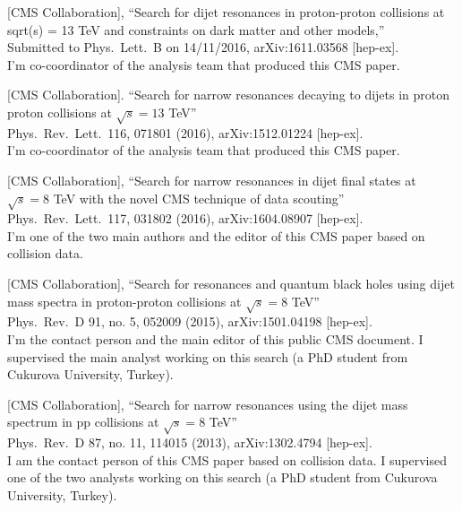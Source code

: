 \documentclass[10pt, a4paper]{article}
\begin{document}


\begin{thebibliography}{599}

  [CMS Collaboration],
  ``Search for dijet resonances in proton-proton collisions at sqrt(s) = 13 TeV and constraints on dark matter and other models,''\\
  Submitted to Phys.\ Lett.\ B on 14/11/2016, arXiv:1611.03568 [hep-ex].\\
  I'm co-coordinator of the analysis team that produced this CMS paper.
 
  [CMS Collaboration].
  ``Search for narrow resonances decaying to  dijets in proton
    proton collisions at $\sqrt{s}=13$ TeV''\\
  Phys.\ Rev.\ Lett.\  116, 071801 (2016), arXiv:1512.01224 [hep-ex].\\
I'm co-coordinator of the analysis team that produced this CMS paper.

[CMS Collaboration],
  ``Search for narrow resonances in dijet final states at $\sqrt{s}=8$
  TeV with the novel CMS technique of data scouting''\\
  Phys.\ Rev.\ Lett.\  117, 031802 (2016), arXiv:1604.08907 [hep-ex].
\\I'm one of the two main authors and the editor of this CMS paper based on
collision data.

  [CMS Collaboration],
  ``Search for resonances and quantum black holes using dijet mass
  spectra in proton-proton collisions at $\sqrt{s}=8$ TeV''\\
  Phys.\ Rev.\ D 91, no. 5, 052009 (2015), arXiv:1501.04198 [hep-ex].
  \\I'm the contact person and the main editor of this public CMS document. I supervised the main analyst working on this search (a PhD student from Cukurova University, Turkey).

[CMS Collaboration],
 ``Search for narrow resonances using the dijet mass spectrum in pp collisions at $\sqrt{s}=8$ TeV''\\
Phys.\ Rev.\ D 87, no. 11, 114015 (2013), arXiv:1302.4794 [hep-ex].
 \\ I am the contact person of this CMS paper based on collision data. I supervised one of the two analysts working on this search (a PhD student from Cukurova University, Turkey).  


\end{thebibliography}
\end{document}
